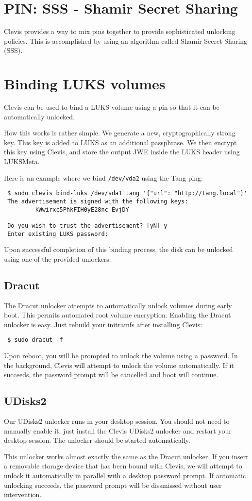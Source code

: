 \documentclass[../xdudla00-porting-Tang-to-Open-WRT.tex]{subfiles}
\begin{document}
\section{PIN: SSS - Shamir Secret Sharing}
Clevis provides a way to mix pins together to provide sophisticated unlocking policies.
This is accomplished by using an algorithm called Shamir Secret Sharing (SSS).

\section{Binding LUKS volumes}
Clevis can be used to bind a LUKS volume using a pin so that it can be automatically unlocked.

How this works is rather simple. We generate a new, cryptographically strong key. This key is added to LUKS as an additional passphrase. We then encrypt this key using Clevis, and store the output JWE inside the LUKS header using LUKSMeta.

Here is an example where we bind {\tt /dev/vda2} using the Tang ping:
{\tt \begin{verbatim} $ sudo clevis bind-luks /dev/sda1 tang '{"url": "http://tang.local"}'
 The advertisement is signed with the following keys:
         kWwirxc5PhkFIH0yE28nc-EvjDY

 Do you wish to trust the advertisement? [yN] y
 Enter existing LUKS password:\end{verbatim}
}
Upon successful completion of this binding process, the disk can be unlocked using one of the provided unlockers.

\subsection{Dracut}
The Dracut unlocker attempts to automatically unlock volumes during early boot. This permits automated root volume encryption. Enabling the Dracut unlocker is easy. Just rebuild your initramfs after installing Clevis:

{\tt \begin{verbatim} $ sudo dracut -f\end{verbatim}
}

Upon reboot, you will be prompted to unlock the volume using a password. In the background, Clevis will attempt to unlock the volume automatically. If it succeeds, the password prompt will be cancelled and boot will continue.

\subsection{UDisks2}
Our UDisks2 unlocker runs in your desktop session.
You should not need to manually enable it; just install the Clevis UDisks2 unlocker and restart your desktop session.
The unlocker should be started automatically.

This unlocker works almost exactly the same as the Dracut unlocker.
If you insert a removable storage device that has been bound with Clevis, we will attempt to unlock it automatically in parallel with a desktop password prompt.
If automatic unlocking succeeds, the password prompt will be dissmissed without user intervention.
\end{document}
